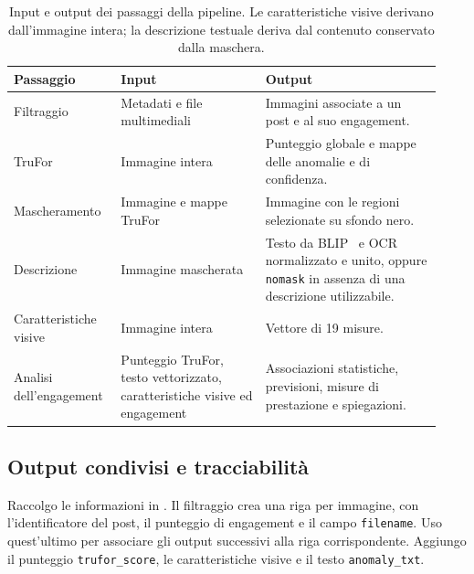 \begin{table}[htbp]
    \centering
    \small
    \caption{Input e output dei passaggi della pipeline. Le caratteristiche visive derivano dall'immagine intera; la descrizione testuale deriva dal contenuto conservato dalla maschera.}
    \label{tab:pipeline-passaggi}
    \begin{tabular}{@{}>{\raggedright\arraybackslash}p{0.22\linewidth}>{\raggedright\arraybackslash}p{0.32\linewidth}>{\raggedright\arraybackslash}p{0.39\linewidth}@{}}
        \toprule
        Passaggio & Input & Output \\
        \midrule
        Filtraggio & Metadati e file multimediali & Immagini associate a un post e al suo engagement. \\
        \addlinespace
        TruFor~\cite{Guillaro_2023_CVPR} & Immagine intera & Punteggio globale e mappe delle anomalie e di confidenza. \\
        \addlinespace
        Mascheramento & Immagine e mappe TruFor & Immagine con le regioni selezionate su sfondo nero. \\
        \addlinespace
        Descrizione & Immagine mascherata & Testo da BLIP~\cite{pmlr-v162-li22n} e OCR~\cite{easyocr_software} normalizzato e unito, oppure \texttt{nomask} in assenza di una descrizione utilizzabile. \\
        \addlinespace
        Caratteristiche visive & Immagine intera & Vettore di 19 misure. \\
        \addlinespace
        Analisi dell'engagement & Punteggio TruFor, testo vettorizzato, caratteristiche visive ed engagement & Associazioni statistiche, previsioni, misure di prestazione e spiegazioni. \\
        \bottomrule
    \end{tabular}
\end{table}

\subsection{Output condivisi e tracciabilità}
\label{subsec:pipeline-output}

Raccolgo le informazioni in . Il filtraggio crea una riga per immagine, con l'identificatore del post, il punteggio di engagement e il campo \texttt{filename}. Uso quest'ultimo per associare gli output successivi alla riga corrispondente. Aggiungo il punteggio \texttt{trufor\_score}, le caratteristiche visive e il testo \texttt{anomaly\_txt}.

